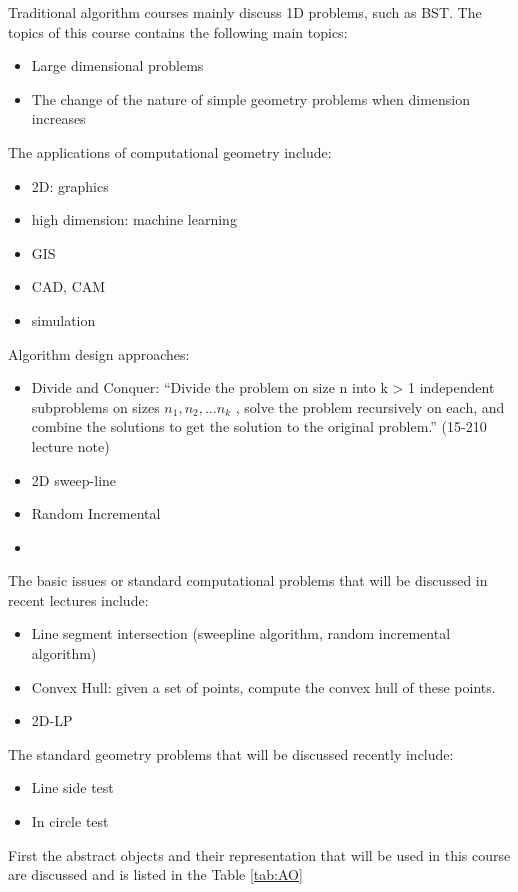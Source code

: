 \documentclass[12pt]{article}
\newcommand{\tref}[1]{Table \ref{#1}}
\begin{document}
Traditional algorithm courses mainly discuss 1D problems, such as
BST. The topics of this course contains the following main topics:
\begin{itemize}
\item Large dimensional problems
\item The change of the nature of simple geometry problems when
  dimension increases
\end{itemize}
The applications of computational geometry include:
\begin{itemize}
\item 2D: graphics
\item high dimension: machine learning
\item GIS
\item CAD, CAM
\item simulation
\end{itemize}
Algorithm design approaches:
\begin{itemize}
\item Divide and Conquer: ``Divide the problem on size n into k > 1
  independent subproblems on sizes $n_1 , n_2 , \dots n_k$ , solve the
  problem recursively on each, and combine the solutions to get the
  solution to the original problem.'' (15-210 lecture note)
\item 2D sweep-line
\item Random Incremental
\item 
\end{itemize}
The basic issues or standard computational problems that will be
discussed in recent lectures include:
\begin{itemize}
\item Line segment intersection (sweepline algorithm, random
  incremental algorithm)
\item Convex Hull: given a set of points, compute the convex hull of
  these points.
\item 2D-LP
\end{itemize}
The standard geometry problems that will be discussed recently
include:
\begin{itemize}
\item Line side test
\item In circle test
\end{itemize}
First the abstract objects and their representation that will be used
in this course are discussed and is listed in the \tref{tab:AO}
\end{document}
